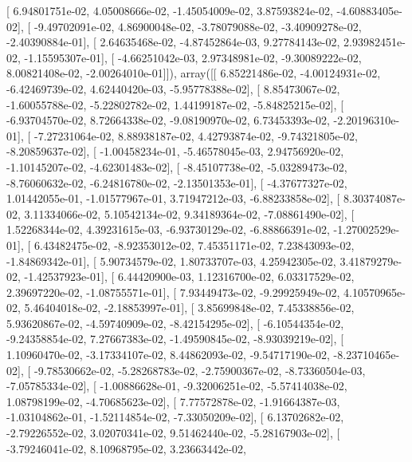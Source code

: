 \documentclass{article}
\begin{document}
       [  6.94801751e-02,   4.05008666e-02,  -1.45054009e-02,
          3.87593824e-02,  -4.60883405e-02],
       [ -9.49702091e-02,   4.86900048e-02,  -3.78079088e-02,
         -3.40909278e-02,  -2.40390884e-01],
       [  2.64635468e-02,  -4.87452864e-03,   9.27784143e-02,
          2.93982451e-02,  -1.15595307e-01],
       [ -4.66251042e-03,   2.97348981e-02,  -9.30089222e-02,
          8.00821408e-02,  -2.00264010e-01]]), array([[  6.85221486e-02,  -4.00124931e-02,  -6.42469739e-02,
          4.62440420e-03,  -5.95778388e-02],
       [  8.85473067e-02,  -1.60055788e-02,  -5.22802782e-02,
          1.44199187e-02,  -5.84825215e-02],
       [ -6.93704570e-02,   8.72664338e-02,  -9.08190970e-02,
          6.73453393e-02,  -2.20196310e-01],
       [ -7.27231064e-02,   8.88938187e-02,   4.42793874e-02,
         -9.74321805e-02,  -8.20859637e-02],
       [ -1.00458234e-01,  -5.46578045e-03,   2.94756920e-02,
         -1.10145207e-02,  -4.62301483e-02],
       [ -8.45107738e-02,  -5.03289473e-02,  -8.76060632e-02,
         -6.24816780e-02,  -2.13501353e-01],
       [ -4.37677327e-02,   1.01442055e-01,  -1.01577967e-01,
          3.71947212e-03,  -6.88233858e-02],
       [  8.30374087e-02,   3.11334066e-02,   5.10542134e-02,
          9.34189364e-02,  -7.08861490e-02],
       [  1.52268344e-02,   4.39231615e-03,  -6.93730129e-02,
         -6.88866391e-02,  -1.27002529e-01],
       [  6.43482475e-02,  -8.92353012e-02,   7.45351171e-02,
          7.23843093e-02,  -1.84869342e-01],
       [  5.90734579e-02,   1.80733707e-03,   4.25942305e-02,
          3.41879279e-02,  -1.42537923e-01],
       [  6.44420900e-03,   1.12316700e-02,   6.03317529e-02,
          2.39697220e-02,  -1.08755571e-01],
       [  7.93449473e-02,  -9.29925949e-02,   4.10570965e-02,
          5.46404018e-02,  -2.18853997e-01],
       [  3.85699848e-02,   7.45338856e-02,   5.93620867e-02,
         -4.59740909e-02,  -8.42154295e-02],
       [ -6.10544354e-02,  -9.24358854e-02,   7.27667383e-02,
         -1.49590845e-02,  -8.93039219e-02],
       [  1.10960470e-02,  -3.17334107e-02,   8.44862093e-02,
         -9.54717190e-02,  -8.23710465e-02],
       [ -9.78530662e-02,  -5.28268783e-02,  -2.75900367e-02,
         -8.73360504e-03,  -7.05785334e-02],
       [ -1.00886628e-01,  -9.32006251e-02,  -5.57414038e-02,
          1.08798199e-02,  -4.70685623e-02],
       [  7.77572878e-02,  -1.91664387e-03,  -1.03104862e-01,
         -1.52114854e-02,  -7.33050209e-02],
       [  6.13702682e-02,  -2.79226552e-02,   3.02070341e-02,
          9.51462440e-02,  -5.28167903e-02],
       [ -3.79246041e-02,   8.10968795e-02,   3.23663442e-02,
\end{document}
